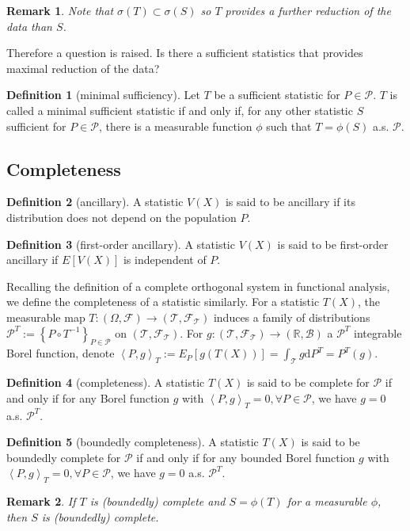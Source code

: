 \documentclass{article}
\newtheorem*{Rk}{Remark}
\theoremstyle{definition}
\newtheorem{Def}{Definition}[section]
\begin{document}
\begin{Rk}
Note that $\sigma(T)\subset\sigma(S)$ so $T$ provides a further reduction of the data than $S$.
\end{Rk}
Therefore a question is raised. Is there a sufficient statistics that provides maximal reduction of the data?
\begin{Def}[minimal sufficiency]
Let $T$ be a sufficient statistic for $P\in\mathcal{P}$. $T$ is called a minimal sufficient statistic if and only if, for any other statistic $S$ sufficient for $P\in\mathcal{P}$, there is a measurable function $\phi$ such that $T=\phi(S)$ a.s. $\mathcal{P}$.
\end{Def}
\subsection{Completeness}
\begin{Def}[ancillary]
A statistic $V(X)$ is said to be ancillary if its distribution does not depend on the population $P$.
\end{Def}
\begin{Def}[first-order ancillary]
A statistic $V(X)$ is said to be first-order ancillary if $E[V(X)]$ is independent of $P$.
\end{Def}
Recalling the definition of a complete orthogonal system in functional analysis, we define the completeness of a statistic similarly. For a statistic $T(X)$, the measurable map $T:(\Omega,\mathcal{F})\longrightarrow(\mathcal{T},\mathcal{F}_\mathcal{T})$ induces a family of distributions $\mathcal{P}^T:=\left\{P\circ T^{-1}\right\}_{P\in\mathcal{P}}$ on $(\mathcal{T},\mathcal{F}_\mathcal{T})$. For $g:(\mathcal{T},\mathcal{F}_\mathcal{T})\longrightarrow(\mathbb{R},\mathcal{B})$ a $\mathcal{P}^T$ integrable Borel function, denote $\left\langle P,g\right\rangle_T:=E_P[g(T(X))]=\int_\mathcal{T}g\mathrm{d}P^T=P^T(g)$.
\begin{Def}[completeness]
A statistic $T(X)$ is said to be complete for $\mathcal{P}$ if and only if for any Borel function $g$ with $\left\langle P,g\right\rangle_T=0,\forall P\in\mathcal{P}$, we have $g=0$ a.s. $\mathcal{P}^T$.
\end{Def}
\begin{Def}[boundedly completeness]
A statistic $T(X)$ is said to be boundedly complete for $\mathcal{P}$ if and only if for any bounded Borel function $g$ with $\left\langle P,g\right\rangle_T=0,\forall P\in\mathcal{P}$, we have $g=0$ a.s. $\mathcal{P}^T$.
\end{Def}
\begin{Rk}
If $T$ is (boundedly) complete and $S=\phi(T)$ for a measurable $\phi$, then $S$ is (boundedly) complete.
\end{Rk}
\end{document}
